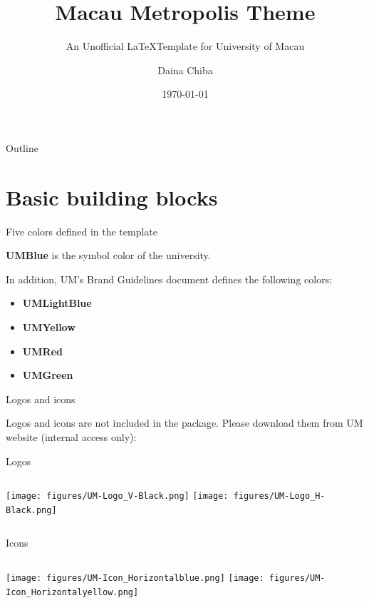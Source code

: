 \documentclass[12pt]{beamer}
\title{Macau Metropolis Theme}
\subtitle{An Unofficial \LaTeX \space Template for University of Macau}
\date{\today}
\author{Daina Chiba}
\institute{University of Macau}
\begin{document}
\maketitle %
\begin{frame}[plain]{Outline} %
	\tableofcontents
\end{frame} 



\section{Basic building blocks}


\begin{frame}{{\color{UMYellow} Five colors} defined in the template}

{\color{UMBlue}\bf UMBlue} is the symbol color of the university.

In addition, UM's Brand Guidelines document defines the following colors:
\begin{itemize}
    \item {\color{UMLightBlue}\bf UMLightBlue}
    \item {\color{UMYellow}\bf UMYellow}
	\item {\color{UMRed}\bf UMRed}
	\item {\color{UMGreen}\bf UMGreen}
\end{itemize}
\end{frame}

\begin{frame}{Logos and icons}

Logos and icons are not included in the package. Please download them from UM website (internal access only):  

Logos
	\begin{columns}
        \centering
        \texttt{[image: figures/UM-Logo\_V-Black.png]}
        \centering
        \texttt{[image: figures/UM-Logo\_H-Black.png]}
	\end{columns} 

\vspace{10pt}

Icons
	\begin{columns}
	\column{0.48\linewidth}
        \centering
        \texttt{[image: figures/UM-Icon\_Horizontalblue.png]}
	\column{0.48\linewidth}
        \centering
        \texttt{[image: figures/UM-Icon\_Horizontalyellow.png]}
	\end{columns} 

\end{frame}
\end{document}
